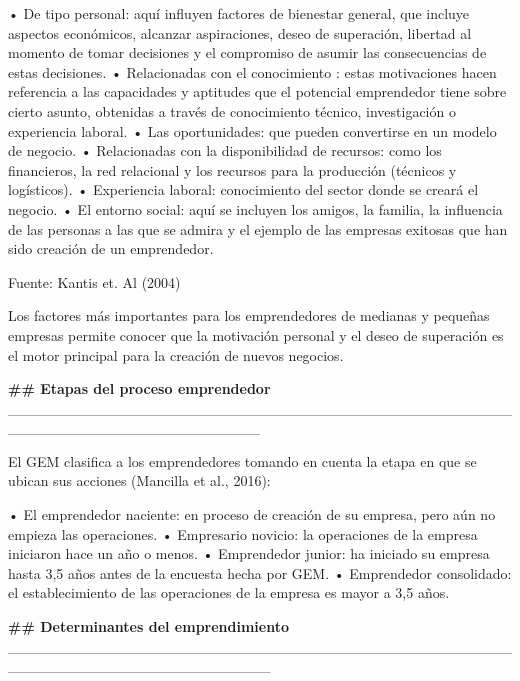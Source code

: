 \documentclass[
  letterpaper,
  DIV=11,
  numbers=noendperiod]{scrreprt}
\begin{document}
• De tipo personal: aquí influyen factores de bienestar general, que
incluye aspectos económicos, alcanzar aspiraciones, deseo de superación,
libertad al momento de tomar decisiones y el compromiso de asumir las
consecuencias de estas decisiones. • Relacionadas con el conocimiento :
estas motivaciones hacen referencia a las capacidades y aptitudes que el
potencial emprendedor tiene sobre cierto asunto, obtenidas a través de
conocimiento técnico, investigación o experiencia laboral. • Las
oportunidades: que pueden convertirse en un modelo de negocio. •
Relacionadas con la disponibilidad de recursos: como los financieros, la
red relacional y los recursos para la producción (técnicos y
logísticos). • Experiencia laboral: conocimiento del sector donde se
creará el negocio. • El entorno social: aquí se incluyen los amigos, la
familia, la influencia de las personas a las que se admira y el ejemplo
de las empresas exitosas que han sido creación de un emprendedor.

Fuente: Kantis et. Al (2004)

Los factores más importantes para los emprendedores de medianas y
pequeñas empresas permite conocer que la motivación personal y el deseo
de superación es el motor principal para la creación de nuevos negocios.

\textbf{\#\# Etapas del proceso emprendedor }
\_\_\_\_\_\_\_\_\_\_\_\_\_\_\_\_\_\_\_\_\_\_\_\_\_\_\_\_\_\_\_\_\_\_\_\_\_\_\_\_\_\_\_\_\_\_\_\_\_\_\_\_\_\_\_\_\_\_\_\_\_\_\_\_\_\_\_\_\_\_\_\_

El GEM clasifica a los emprendedores tomando en cuenta la etapa en que
se ubican sus acciones (Mancilla et al., 2016):

• El emprendedor naciente: en proceso de creación de su empresa, pero
aún no empieza las operaciones. • Empresario novicio: la operaciones de
la empresa iniciaron hace un año o menos. • Emprendedor junior: ha
iniciado su empresa hasta 3,5 años antes de la encuesta hecha por GEM. •
Emprendedor consolidado: el establecimiento de las operaciones de la
empresa es mayor a 3,5 años.

\textbf{\#\# Determinantes del emprendimiento}
\_\_\_\_\_\_\_\_\_\_\_\_\_\_\_\_\_\_\_\_\_\_\_\_\_\_\_\_\_\_\_\_\_\_\_\_\_\_\_\_\_\_\_\_\_\_\_\_\_\_\_\_\_\_\_\_\_\_\_\_\_\_\_\_\_\_\_\_\_\_\_\_\_
\end{document}
